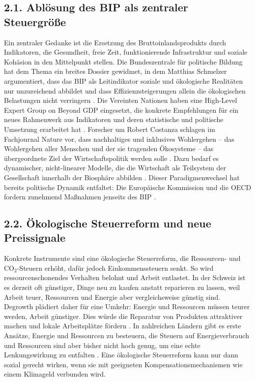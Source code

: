 \documentclass[12pt, a4paper]{article}
\begin{document}
	\subsection*{2.1. Ablösung des BIP als zentraler Steuergröße}
	Ein zentraler Gedanke ist die Ersetzung des Bruttoinlandsprodukts durch Indikatoren,
	die Gesundheit, freie Zeit, funktionierende Infrastruktur und soziale Kohäsion in den
	Mittelpunkt stellen.
	Die Bundeszentrale für politische Bildung hat dem Thema ein
	breites Dossier gewidmet, in dem Matthias Schmelzer argumentiert, dass das BIP als
	Leitindikator soziale und ökologische Realitäten nur unzureichend abbildet und dass
	Effizienzsteigerungen allein die ökologischen Belastungen nicht verringern
	\cite{bpb2025}.
	Die Vereinten Nationen haben eine High-Level Expert Group on Beyond
	GDP eingesetzt, die konkrete Empfehlungen für ein neues Rahmenwerk aus Indikatoren
	und deren statistische und politische Umsetzung erarbeitet hat \cite{un2025}.
	Forscher
	um Robert Costanza schlagen im Fachjournal Nature vor, dass nachhaltiges und
	inklusives Wohlergehen – das Wohlergehen aller Menschen und der sie tragenden
	Ökosysteme – das übergeordnete Ziel der Wirtschaftspolitik werden solle
	\cite{nature2025}.
	Dazu bedarf es dynamischer, nicht-linearer Modelle, die die
	Wirtschaft als Teilsystem der Gesellschaft innerhalb der Biosphäre abbilden
	\cite{nature2025}.
	Dieser Paradigmenwechsel hat bereits politische Dynamik entfaltet:
	Die Europäische Kommission und die OECD fordern zunehmend Maßnahmen jenseits des BIP
	\cite{nature2025}.
	
	\subsection*{2.2. Ökologische Steuerreform und neue Preissignale}
	Konkrete Instrumente sind eine ökologische Steuerreform, die Ressourcen- und
	CO$_2$-Steuern erhöht, dafür jedoch Einkommenssteuern senkt.
	So wird ressourcenschonendes
	Verhalten belohnt und Arbeit entlastet. In der Schweiz ist es derzeit oft günstiger,
	Dinge neu zu kaufen anstatt reparieren zu lassen, weil Arbeit teuer, Ressourcen und
	Energie aber vergleichsweise günstig sind.
	Degrowth plädiert daher für eine Umkehr:
	Energie und Ressourcen müssen teurer werden, Arbeit günstiger.
	Dies würde die
	Reparatur von Produkten attraktiver machen und lokale Arbeitsplätze fördern
	\cite{tsri2025}.
	In zahlreichen Ländern gibt es erste Ansätze, Energie und
	Ressourcen zu besteuern, die Steuern auf Energieverbrauch und Ressourcen sind aber
	bisher nicht hoch genug, um eine echte Lenkungswirkung zu entfalten \cite{tsri2025}.
	Eine ökologische Steuerreform kann nur dann sozial gerecht wirken, wenn sie mit
	geeigneten Kompensationsmechanismen wie einem Klimageld verbunden wird.
	
\end{document}
